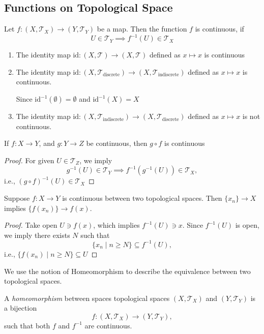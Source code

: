 \subsection{Functions on Topological Space}
\begin{definition}[Continuous]
Let $f:(X,\mathcal{T}_X)\to(Y,\mathcal{T}_Y)$ be a map. Then the function $f$ is continuous, if
\[
U\in\mathcal{T}_Y\implies
f^{-1}(U)\in\mathcal{T}_X
\]
\end{definition}
\begin{example}
\begin{enumerate}
\item
The identity map $\text{id}: (X,\mathcal{T})\to(X,\mathcal{T})$ defined as 
$x\mapsto x$ is continuous
\item
The identity map $\text{id}: (X,\mathcal{T}_{\text{discrete}})\to(X,\mathcal{T}_{\text{indiscrete}})$ defined as $x\mapsto x$ is continuous.

Since $\text{id}^{-1}(\emptyset)=\emptyset$ and $\text{id}^{-1}(X)=X$
\item
The identity map $\text{id}: (X,\mathcal{T}_{\text{indiscrete}})\to(X,\mathcal{T}_{\text{discrete}})$ defined as $x\mapsto x$ is not continuous.
\end{enumerate}
\end{example}

\begin{proposition}
If $f:X\to Y$, and $g:Y\to Z$ be continuous, then $g\circ f$ is continuous
\end{proposition}

\begin{proof}
For given $U\in\mathcal{T}_Z$, we imply
\[
g^{-1}(U)\in\mathcal{T}_Y
\implies
f^{-1}(g^{-1}(U))\in\mathcal{T}_X,
\]
i.e., $(g\circ f)^{-1}(U)\in\mathcal{T}_X$
\end{proof}

\begin{proposition}
Suppose $f:X\to Y$ is continuous between two topological spaces. Then $\{x_n\}\to X$ implies $\{f(x_n)\}\to f(x)$.
\end{proposition}
\begin{proof}
Take open $U\ni f(x)$, which implies $f^{-1}(U)\ni x$. Since $f^{-1}(U)$ is open, we imply there exists $N$ such that 
\[
\{x_n\mid n\ge N\}\subseteq f^{-1}(U),
\] 
i.e., $\{f(x_n)\mid n\ge N\}\subseteq U$
\end{proof}

We use the notion of Homeomorphism to describe the equivalence between two topological spaces.
\begin{definition}[Homeomorphism]
A \emph{homeomorphism} between spaces topological spaces $(X,\mathcal{T}_X)$ and $(Y,\mathcal{T}_Y)$ is a bijection 
\[
f:(X,\mathcal{T}_X)\to(Y,\mathcal{T}_Y),
\]
such that both $f$ and $f^{-1}$ are continuous.
\end{definition}

